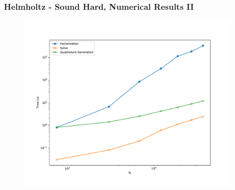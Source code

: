 \begin{frame}
    \frametitle{Helmholtz - Sound Hard, Numerical Results II}

    \begin{figure}
        \includegraphics[width=\textwidth]{assets/scaling.pdf}
    \end{figure}
\end{frame}








